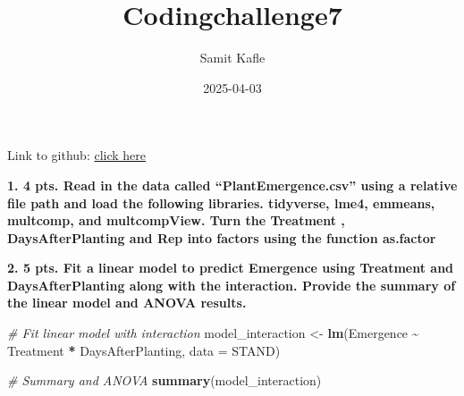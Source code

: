\documentclass[
]{article}
\title{Codingchallenge7}
\author{Samit Kafle}
\date{2025-04-03}
\newenvironment{Shaded}{\begin{snugshade}}{\end{snugshade}}
\newcommand{\AttributeTok}[1]{\textcolor[rgb]{0.13,0.29,0.53}{#1}}
\newcommand{\CommentTok}[1]{\textcolor[rgb]{0.56,0.35,0.01}{\textit{#1}}}
\newcommand{\DocumentationTok}[1]{\textcolor[rgb]{0.56,0.35,0.01}{\textbf{\textit{#1}}}}
\newcommand{\FunctionTok}[1]{\textcolor[rgb]{0.13,0.29,0.53}{\textbf{#1}}}
\newcommand{\NormalTok}[1]{#1}
\newcommand{\OtherTok}[1]{\textcolor[rgb]{0.56,0.35,0.01}{#1}}
\newcommand{\SpecialCharTok}[1]{\textcolor[rgb]{0.81,0.36,0.00}{\textbf{#1}}}
\newcommand{\StringTok}[1]{\textcolor[rgb]{0.31,0.60,0.02}{#1}}
\begin{document}
\maketitle

Link to github:
\href{https://github.com/SamitKafle/coding_challenge7.git}{click here}

\textbf{1. 4 pts. Read in the data called ``PlantEmergence.csv'' using a
relative file path and load the following libraries. tidyverse, lme4,
emmeans, multcomp, and multcompView. Turn the Treatment ,
DaysAfterPlanting and Rep into factors using the function as.factor}

\begin{Shaded}
\end{Shaded}

\textbf{2. 5 pts. Fit a linear model to predict Emergence using
Treatment and DaysAfterPlanting along with the interaction. Provide the
summary of the linear model and ANOVA results. }

\begin{Shaded}
\begin{Highlighting}[]
\CommentTok{\# Fit linear model with interaction}
\NormalTok{model\_interaction }\OtherTok{\textless{}{-}} \FunctionTok{lm}\NormalTok{(Emergence }\SpecialCharTok{\textasciitilde{}}\NormalTok{ Treatment }\SpecialCharTok{*}\NormalTok{ DaysAfterPlanting, }\AttributeTok{data =}\NormalTok{ STAND)}

\CommentTok{\# Summary and ANOVA}
\FunctionTok{summary}\NormalTok{(model\_interaction)}
\end{Highlighting}
\end{Shaded}
\end{document}
